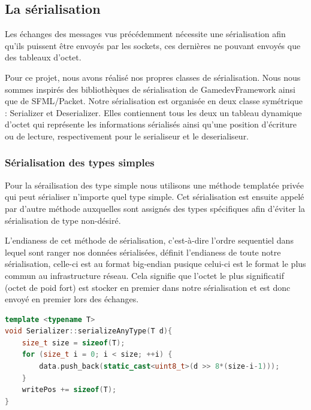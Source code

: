 \documentclass[a4paper, 12pt]{article}
\begin{document}
	\subsection{La sérialisation}

			Les échanges des messages vus précédemment nécessite une sérialisation afin qu'ils puissent être envoyés par les sockets, ces dernières ne pouvant envoyés que des tableaux d'octet.


			Pour ce projet, nous avons réalisé nos propres classes de sérialisation. Nous nous sommes inspirés des bibliothèques de sérialisation de GamedevFramework ainsi que de SFML/Packet. 
			Notre sérialisation est organisée en deux classe symétrique : Serializer et Deserializer. Elles contiennent tous les deux un tableau dynamique d'octet qui représente les informations sérialisés ainsi qu'une position d'écriture ou de lecture, respectivement pour le serialiseur et le deserialiseur. 
			
			\subsubsection{Sérialisation des types simples}

			Pour la sérailisation des type simple nous utilisons une méthode templatée privée qui peut sérialiser n'importe quel type simple. Cet sérialisation est ensuite appelé par d'autre méthode auxquelles sont assignés des types spécifiques afin d'éviter la sérialisation de type non-désiré.

			
			L'endianess de cet méthode de sérialisation, c'est-à-dire l'ordre sequentiel dans lequel sont ranger nos données sérialisées, définit l'endianess de toute notre sérialisation, celle-ci est au format big-endian pusique celui-ci est le format le plus commun au infrastructure réseau. Cela signifie que l'octet le plus significatif (octet de poid fort) est stocker en premier dans notre sérialisation et est donc envoyé en premier lors des échanges.

\begin{lstlisting}[language=C++, caption=Méthode de sérailisation de type simple\, data est notre tableau dynamique\, d la varaible de type T à sérailiser et writePos la position d'écriture du sérialiseur]
template <typename T>
void Serializer::serializeAnyType(T d){
	size_t size = sizeof(T);
	for (size_t i = 0; i < size; ++i) {
		data.push_back(static_cast<uint8_t>(d >> 8*(size-i-1))); 
	}
	writePos += sizeof(T);
}\end{lstlisting}
\end{document}
